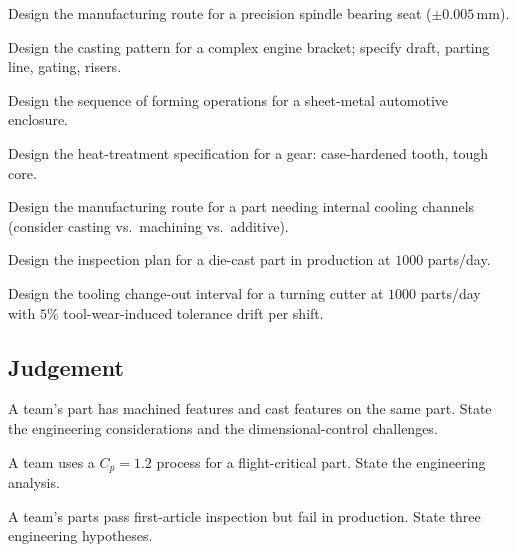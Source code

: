 \begin{exercise}
Design the manufacturing route for a precision spindle bearing seat ($\pm 0.005\,\si{\milli\meter}$).
\end{exercise}

\begin{exercise}
Design the casting pattern for a complex engine bracket; specify draft, parting line, gating, risers.
\end{exercise}

\begin{exercise}
Design the sequence of forming operations for a sheet-metal automotive enclosure.
\end{exercise}

\begin{exercise}
Design the heat-treatment specification for a gear: case-hardened tooth, tough core.
\end{exercise}

\begin{exercise}
Design the manufacturing route for a part needing internal cooling channels (consider casting vs.\ machining vs.\ additive).
\end{exercise}

\begin{exercise}
Design the inspection plan for a die-cast part in production at $1000$ parts/day.
\end{exercise}

\begin{exercise}
Design the tooling change-out interval for a turning cutter at $1000$ parts/day with $5\%$ tool-wear-induced tolerance drift per shift.
\end{exercise}

\subsection*{Judgement}

\begin{exercise}
A team's part has machined features and cast features on the same part. State the engineering considerations and the dimensional-control challenges.
\end{exercise}

\begin{exercise}
A team uses a $C_p = 1.2$ process for a flight-critical part. State the engineering analysis.
\end{exercise}

\begin{exercise}
A team's parts pass first-article inspection but fail in production. State three engineering hypotheses.
\end{exercise}

